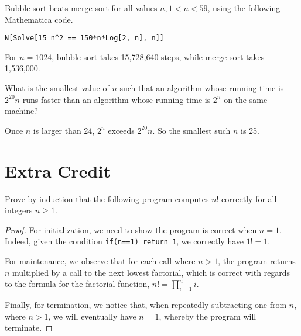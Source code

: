 \documentclass[10pt,letterpaper]{amspset}
\theoremstyle{definition}
\theoremstyle{remark}
\numberwithin{subcase}{case}
\numberwithin{equation}{section}
\begin{document}
\begin{solution}
Bubble sort beats merge sort for all values $n, 1 < n < 59$, using the following Mathematica code.
\begin{verbatim}
N[Solve[15 n^2 == 150*n*Log[2, n], n]]
\end{verbatim}
For $n=1024$, bubble sort takes 15,728,640 steps, while merge sort takes 1,536,000.
\end{solution}

\begin{problem}[6]
What is the smallest value of $n$ such that an algorithm whose running time is 
$2^{20} n$ runs faster than an algorithm whose running time is $2^n$ on the same machine? 
\end{problem}

\begin{solution}
Once $n$ is larger than 24, $2^n$ exceeds $2^{20} n$.  So the smallest such $n$ is 25.
\end{solution}

\section{Extra Credit}
\begin{problem}
Prove by induction that the following program computes $n!$ correctly for all integers $n \geq 1$.
\end{problem}

\begin{solution}
\begin{proof}
For initialization, we need to show the program is correct when $n=1$.  Indeed, given the condition \verb!if(n==1) return 1!, we correctly have $1! = 1$.

For maintenance, we observe that for each call where $n > 1$, the program returns $n$ multiplied by a call to the next lowest factorial, which is correct with regards to the formula for the factorial function, $n! = \prod\limits_{i=1}^{n} i$.

Finally, for termination, we notice that, when repeatedly subtracting one from $n$, where $n > 1$, we will eventually have $n = 1$, whereby the program will terminate.
\end{proof}
\end{solution}
\end{document}
